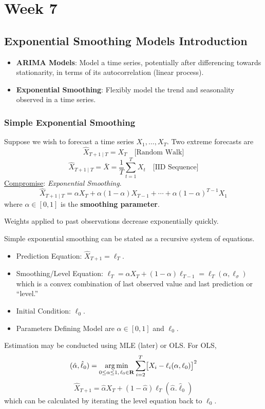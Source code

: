 \chapter{Week 7}
\section{Exponential Smoothing Models Introduction}
\begin{itemize}
      \item \textbf{ARIMA Models}: Model a time series, potentially after differencing towards
            stationarity, in terms of its autocorrelation (linear process).
      \item \textbf{Exponential Smoothing}: Flexibly model the trend and seasonality
            observed in a time series.
\end{itemize}
\subsection*{Simple Exponential Smoothing}
Suppose we wish to forecast a time series $ X_1,\ldots,X_T $. Two extreme
forecasts are
\[ \hat{X}_{T+1\mid T}=X_T\quad\text{[Random Walk]} \]
\[ \hat{X}_{T+1\mid T}=\bar{X}=\frac{1}{T} \sum_{t=1}^{T} X_t \quad\text{[IID Sequence]} \]
\underline{Compromise}: \emph{Exponential Smoothing}.
\[ \hat{X}_{T+1\mid T}=\alpha X_T+\alpha(1-\alpha)X_{T-1}+\cdots+\alpha(1-\alpha)^{T-1}X_1 \]
where $ \alpha\in[0,1] $ is the \textbf{smoothing parameter}.

Weights applied to past observations decrease exponentially quickly.

Simple exponential smoothing can be stated as a recursive system of equations.
\begin{itemize}
      \item Prediction Equation: $ \hat{X}_{T+1}=\ell_T $.
      \item Smoothing/Level Equation: $ \ell_T=\alpha X_T+(1-\alpha)\ell_{T-1}=\ell_T(\alpha,\ell_\sigma) $
            which is a convex combination of last observed value and last prediction or ``level.''
      \item Initial Condition: $ \ell_0 $.
      \item Parameters Defining Model are $ \alpha\in[0,1] $ and $ \ell_0 $.
\end{itemize}
Estimation may be conducted using MLE (later) or OLS\@. For OLS,
\[ (\hat{\alpha},\hat{\ell}_0)=\operatorname*{arg\,min}_{0\le \alpha\le 1,\,\ell_0\in\mathbf{R}}
      \sum_{i=2}^{T} \bigl[X_i-\ell_i(\alpha,\ell_0)\bigr]^2 \]
\[ \hat{X}_{T+1}=\hat{\alpha}X_T+(1-\hat{\alpha})\ell_T(\hat{\alpha}.\hat{\ell}_0) \]
which can be calculated by iterating the level equation back to $ \ell_0 $.

